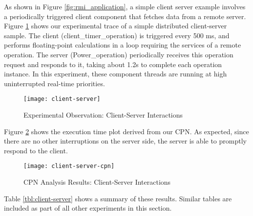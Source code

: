 As shown in Figure \ref{fig:rmi_application}, a simple client server example involves a periodically triggered client component that fetches data from a remote server. Figure \ref{fig:client-server} shows our experimental trace of a simple distributed client-server sample. The client (client\_timer\_operation) is triggered every 500 ms, and performs floating-point calculations in a loop requiring the services of a remote operation.  %
The server (Power\_operation) periodically receives this operation request and responds to it, taking about 1.2s to complete each operation instance. In this experiment, these component threads are running at high uninterrupted real-time priorities. 

\begin{figure}[h]
	\centering
	\texttt{[image: client-server]}
	\caption{Experimental Observation: Client-Server Interactions}
	\label{fig:client-server}
\end{figure}
\FloatBarrier

Figure \ref{fig:client-server-cpn} shows the execution time plot derived from our CPN. As expected, since there are no other interruptions on the server side, the server is able to promptly respond to the client.

\begin{figure}[h]
	\centering
	\texttt{[image: client-server-cpn]}
	\caption{CPN Analysis Results: Client-Server Interactions}
	\label{fig:client-server-cpn}
\end{figure}
\FloatBarrier

Table \ref{tbl:client-server} shows a summary of these results. Similar tables are included as part of all other experiments in this section. 

